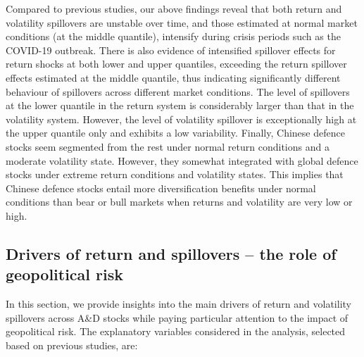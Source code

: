 \documentclass[
  letterpaper,
  DIV=11,
  numbers=noendperiod]{scrartcl}
\begin{document}
Compared to previous studies, our above findings reveal that both return
and volatility spillovers are unstable over time, and those estimated at
normal market conditions (at the middle quantile), intensify during
crisis periods such as the COVID-19 outbreak. There is also evidence of
intensified spillover effects for return shocks at both lower and upper
quantiles, exceeding the return spillover effects estimated at the
middle quantile, thus indicating significantly different behaviour of
spillovers across different market conditions. The level of spillovers
at the lower quantile in the return system is considerably larger than
that in the volatility system. However, the level of volatility
spillover is exceptionally high at the upper quantile only and exhibits
a low variability. Finally, Chinese defence stocks seem segmented from
the rest under normal return conditions and a moderate volatility state.
However, they somewhat integrated with global defence stocks under
extreme return conditions and volatility states. This implies that
Chinese defence stocks entail more diversification benefits under normal
conditions than bear or bull markets when returns and volatility are
very low or high.

\hypertarget{drivers-of-return-and-spillovers-the-role-of-geopolitical-risk}{%
\subsection{Drivers of return and spillovers -- the role of geopolitical
risk}\label{drivers-of-return-and-spillovers-the-role-of-geopolitical-risk}}

In this section, we provide insights into the main drivers of return and
volatility spillovers across A\&D stocks while paying particular
attention to the impact of geopolitical risk. The explanatory variables
considered in the analysis, selected based on previous studies, are:
\end{document}
